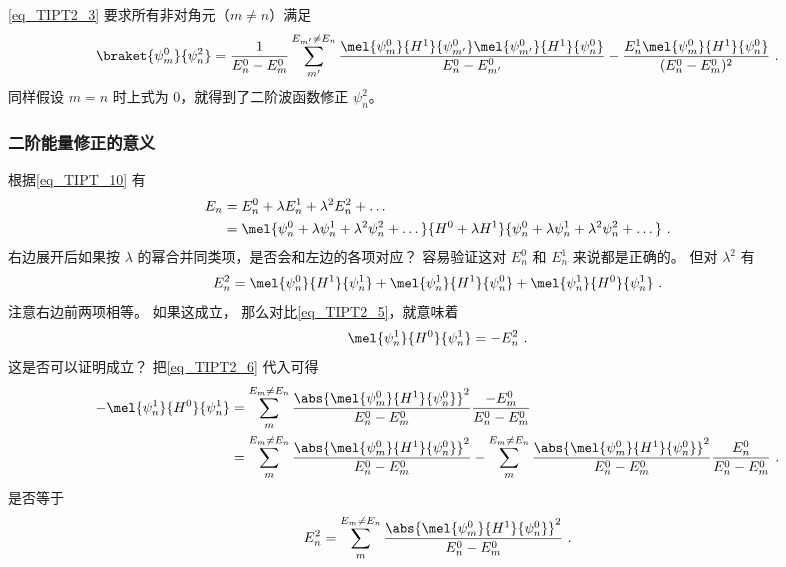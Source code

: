 \autoref{eq_TIPT2_3} 要求所有非对角元（$m\ne n$）满足
\begin{equation} %
\braket{\psi_m^0}{\psi_n^2} =
\frac{1}{E_n^0-E_m^0}\sum_{m'}^{E_{m'}\ne E_n}\frac{\mel{\psi_m^0}{H^1}{\psi_{m'}^0}\mel{\psi_{m'}^0}{H^1}{\psi_n^0}}{E_n^0 - E_{m'}^0} - \frac{E_n^1\mel{\psi_m^0}{H^1}{\psi_n^0}}{(E_n^0 - E_m^0)^2}~.
\end{equation}
同样假设 $m=n$ 时上式为 0，就得到了二阶波函数修正 $\psi_n^2$。

\subsubsection{二阶能量修正的意义}
根据\autoref{eq_TIPT_10} 有
\begin{equation}
\begin{aligned}
E_n &= E_n^0 + \lambda E_n^1 + \lambda^2 E_n^2 + \dots \\
&=\mel{\psi_n^0 + \lambda\psi_n^1 + \lambda^2\psi_n^2 + \dots}{H^0 + \lambda H^1}{\psi_n^0 + \lambda\psi_n^1 + \lambda^2 \psi_n^2 + \dots}~.
\end{aligned}
\end{equation}
右边展开后如果按 $\lambda$ 的幂合并同类项，是否会和左边的各项对应？ 容易验证这对 $E_n^0$ 和 $E_n^1$ 来说都是正确的。 但对 $\lambda^2$ 有
\begin{equation}
E_n^2 = \mel{\psi_n^0}{H^1}{\psi_n^1} + \mel{\psi_n^1}{H^1}{\psi_n^0} + \mel{\psi_n^1}{H^0}{\psi_n^1}~.
\end{equation}
注意右边前两项相等。 如果这成立， 那么对比\autoref{eq_TIPT2_5}，就意味着
\begin{equation}
\mel{\psi_n^1}{H^0}{\psi_n^1} = -E_n^2~.
\end{equation}
这是否可以证明成立？ 把\autoref{eq_TIPT2_6} 代入可得
\begin{equation}
\begin{aligned}
-\mel{\psi_n^1}{H^0}{\psi_n^1} &= \sum_{m}^{E_m\ne E_n} \frac{\abs{\mel{\psi_m^0}{H^1}{\psi_n^0}}^2}{E_n^0 - E_m^0} \frac{-E_m^0}{E_n^0 - E_m^0}\\
&=\sum_{m}^{E_m\ne E_n} \frac{\abs{\mel{\psi_m^0}{H^1}{\psi_n^0}}^2}{E_n^0 - E_m^0}
-\sum_{m}^{E_m\ne E_n} \frac{\abs{\mel{\psi_m^0}{H^1}{\psi_n^0}}^2}{E_n^0 - E_m^0} \frac{E_n^0}{E_n^0 - E_m^0}~.
\end{aligned}
\end{equation}
是否等于
\begin{equation}
E_n^2 = \sum_{m}^{E_m\ne E_n} \frac{\abs{\mel{\psi_m^0}{H^1}{\psi_n^0}}^2}{E_n^0-E_m^0}~.
\end{equation}
